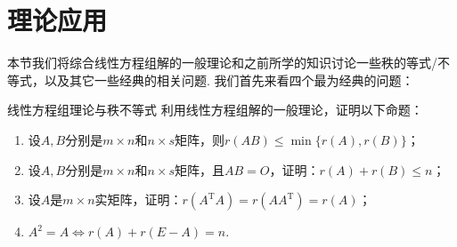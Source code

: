 \section{理论应用}

本节我们将综合线性方程组解的一般理论和之前所学的知识讨论一些秩的等式/不等式，以及其它一些经典的相关问题. 我们首先来看四个最为经典的问题：
\begin{example}{}{线性方程组理论与秩不等式}
    利用线性方程组解的一般理论，证明以下命题：
    \begin{enumerate}
        \item  设$A,B$分别是$m \times n$和$n \times s$矩阵，则$r(AB)\leqslant\min\{r(A),r(B)\}$；

        \item 设$A,B$分别是$m \times n$和$n \times s$矩阵，且$AB=O$，证明：$r(A)+r(B)\leqslant n$；

        \item 设$A$是$m \times n$实矩阵，证明：$r(A^\mathrm{T}A)=r(AA^\mathrm{T})=r(A)$；

        \item $A^2=A \iff r(A)+r(E-A)=n$.
    \end{enumerate}
\end{example}

